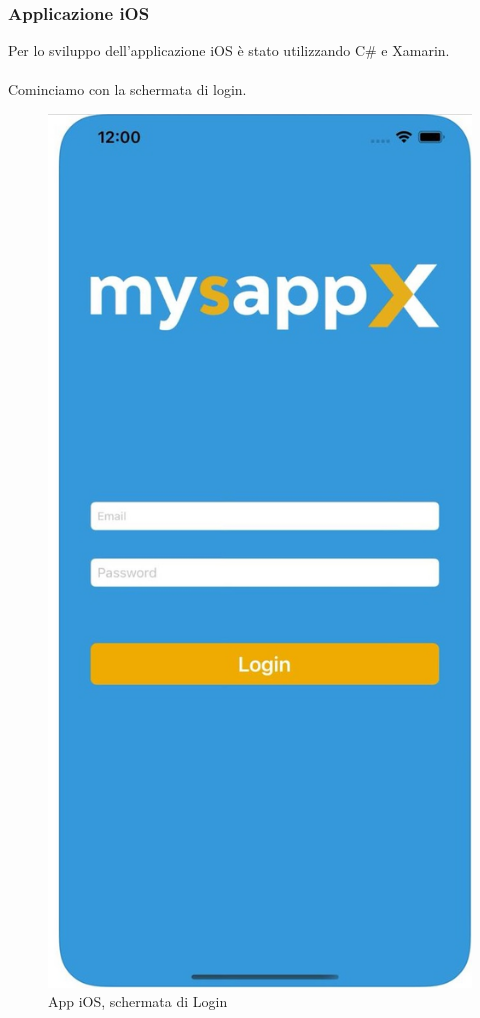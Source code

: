 \subsubsection{Applicazione iOS}
Per lo sviluppo dell'applicazione iOS è stato utilizzando C\# e Xamarin.\\\\
Cominciamo con la schermata di login.\\
\begin{figure}[!h] 
	\centering 
	\includegraphics[scale = 0.2]{immagini/app iOS/login-iOS.jpeg} 
	\caption {App iOS, schermata di Login}
\end{figure}
